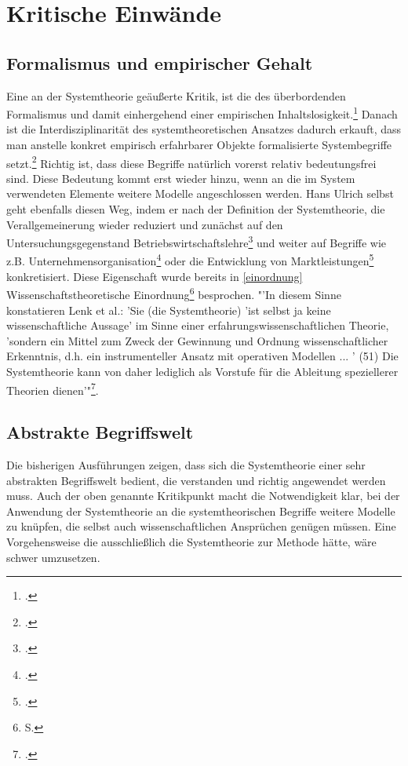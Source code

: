 \documentclass[a4paper,12pt]{article}
\begin{document}
\section{Kritische Einwände}
\subsection{Formalismus und empirischer Gehalt}
Eine an der Systemtheorie geäußerte Kritik, ist die des überbordenden Formalismus und damit einhergehend einer empirischen Inhaltslosigkeit.\footcite[S. 155]{Diesner2015} Danach ist die Interdisziplinarität des systemtheoretischen Ansatzes dadurch erkauft, dass man  anstelle konkret empirisch erfahrbarer Objekte formalisierte Systembegriffe setzt.\footcite[S. 23]{Oelsnitz1994} Richtig ist, dass diese Begriffe natürlich vorerst relativ bedeutungsfrei sind. Diese Bedeutung kommt erst wieder hinzu, wenn an die im System verwendeten Elemente weitere Modelle angeschlossen werden. Hans Ulrich selbst geht ebenfalls diesen Weg, indem er nach der Definition der Systemtheorie, die Verallgemeinerung wieder reduziert und zunächst auf den Untersuchungsgegenstand Betriebswirtschaftslehre\footcite[S. 135]{Ulrich1968} und weiter auf Begriffe wie z.B. Unternehmensorganisation\footcite[212]{Ulrich1968} oder die Entwicklung von Marktleistungen\footcite[299]{Ulrich2016} konkretisiert. Diese Eigenschaft wurde bereits in \ref{einordnung} Wissenschaftstheoretische Einordnung\footnote{S. \pageref{einordnung}} besprochen. "'In diesem Sinne konstatieren Lenk et al.: 'Sie (die Systemtheorie) 'ist selbst ja keine wissenschaftliche Aussage' im Sinne einer erfahrungswissenschaftlichen Theorie, 'sondern ein Mittel zum Zweck der Gewinnung und Ordnung wissenschaftlicher Erkenntnis, d.h. ein instrumenteller Ansatz mit operativen Modellen ... ' (51) Die Systemtheorie kann von daher lediglich als Vorstufe für die Ableitung speziellerer Theorien dienen'"\footcite[S. 24]{Oelsnitz1994}.
\subsection{Abstrakte Begriffswelt}
Die bisherigen Ausführungen zeigen, dass sich die Systemtheorie einer sehr abstrakten Begriffswelt bedient, die verstanden und richtig angewendet werden muss. Auch der oben genannte Kritikpunkt macht die Notwendigkeit klar, bei der Anwendung der Systemtheorie an die systemtheorischen Begriffe weitere Modelle zu knüpfen, die selbst auch wissenschaftlichen Ansprüchen genügen müssen. Eine Vorgehensweise die ausschließlich die Systemtheorie zur Methode hätte, wäre schwer umzusetzen.
\end{document}
